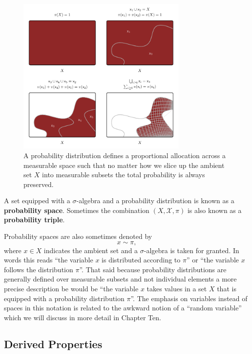 \documentclass[
  letterpaper,
  DIV=11,
  numbers=noendperiod]{scrartcl}
\begin{document}
\begin{figure}

{\centering \includegraphics[width=0.75\textwidth,height=\textheight]{figures/distribution/distribution.pdf}

}

\caption{\label{fig-distribution}A probability distribution defines a
proportional allocation across a measurable space such that no matter
how we slice up the ambient set \(X\) into measurable subsets the total
probability is always preserved.}

\end{figure}

A set equipped with a \(\sigma\)-algebra and a probability distribution
is known as a \textbf{probability space}. Sometimes the combination
\((X, \mathcal{X}, \pi)\) is also known as a \textbf{probability
triple}.

Probability spaces are also sometimes denoted by \[
x \sim \pi,
\] where \(x \in X\) indicates the ambient set and a \(\sigma\)-algebra
is taken for granted. In words this reads ``the variable \(x\) is
distributed according to \(\pi\)'' or ``the variable \(x\) follows the
distribution \(\pi\)''. That said because probability distributions are
generally defined over measurable subsets and not individual elements a
more precise description be would be ``the variable \(x\) takes values
in a set \(X\) that is equipped with a probability distribution
\(\pi\)''. The emphasis on variables instead of spaces in this notation
is related to the awkward notion of a ``random variable'' which we will
discuss in more detail in Chapter Ten.

\hypertarget{derived-properties}{%
\subsection{Derived Properties}\label{derived-properties}}
\end{document}

